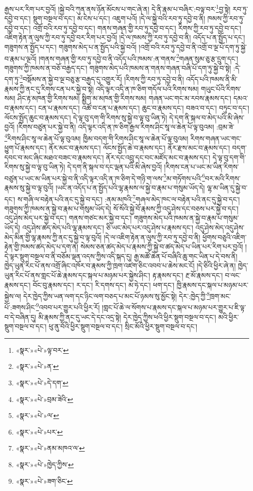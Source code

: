 རྒྱས་པར་རིག་པར་བྱའོ། །སྐྱེ་བའི་ཀུན་ནས་ཉོན་མོངས་པ་གང་ཞེ་ན། དེ་ནི་རྣམ་པ་བཞིར་:བལྟ་བར་\footnote{«སྣར་»«པེ་»ལྟ་བར་}བྱ་སྟེ། རབ་ཏུ་དབྱེ་བ་དང་། སྡུག་བསྔལ་བ་དང་། མ་ངེས་པ་དང་། འཇུག་པའོ། །དེ་ལ་སྐྱེ་བའི་རབ་ཏུ་དབྱེ་བ་ནི། ཁམས་ཀྱི་རབ་ཏུ་དབྱེ་བ་དང་། འགྲོ་བའི་རབ་ཏུ་དབྱེ་བ་དང་། གནས་གཞན་གྱི་རབ་ཏུ་དབྱེ་བ་དང་། རིགས་ཀྱི་རབ་ཏུ་དབྱེ་བ་དང་། འཇིག་རྟེན་ན་ལུས་ཀྱི་རབ་ཏུ་དབྱེ་བར་རིག་པར་བྱའོ། །དེ་ལ་ཁམས་ཀྱི་རབ་ཏུ་དབྱེ་བ་ནི། འདོད་པ་ན་སྤྱོད་པ་དང་། གཟུགས་ན་སྤྱོད་པ་དང་། གཟུགས་མེད་པ་ན་སྤྱོད་པའི་སྐྱེ་བའོ། །འགྲོ་བའི་རབ་ཏུ་དབྱེ་བ་ནི་འགྲོ་བ་ལྔ་པོ་དག་ཏུ་སྐྱེ་བ་རྣམ་པ་ལྔའོ། །གནས་གཞན་གྱི་རབ་ཏུ་དབྱེ་བ་ནི་འདོད་པའི་ཁམས་:ན་གནས་\footnote{«སྣར་»«པེ་»ན་}གཞན་སུམ་ཅུ་རྩ་དྲུག་དང་། གཟུགས་ཀྱི་ཁམས་ན་བཅོ་བརྒྱད་དང་། གཟུགས་མེད་པའི་ཁམས་ན་གནས་གཞན་བཞི་པོ་དག་ཏུ་སྐྱེ་བ་སྟེ། :དེ་དག་ཏུ་\footnote{«སྣར་»«པེ་»དེ་དག་}བསྡོམས་ན་སྐྱེ་བ་ལྔ་བཅུ་རྩ་བརྒྱད་དུ་འགྱུར་རོ། །རིགས་ཀྱི་རབ་ཏུ་དབྱེ་བ་ནི། འདོད་པའི་ཁམས་ནི་མི་རྣམས་ཀྱི་ནང་དུ་རིགས་ངན་པར་སྐྱེ་བ་སྟེ། འདི་ལྟར་འདི་ན་ཁ་ཅིག་གདོལ་པའི་རིགས་སམ། གཡུང་པོའི་རིགས་སམ། ཤིང་རྟ་མཁན་གྱི་རིགས་སམ། སྨྱིག་མ་མཁན་གྱི་རིགས་སམ། གཞན་ཡང་གང་མ་རབས་རྣམས་དང་། དམའ་བ་རྣམས་དང་། ངན་པ་རྣམས་དང་། འཚོ་བ་ངན་པ་རྣམས་དང་། ཆུང་བ་རྣམས་དང་། བཟའ་བ་དང་། བཏུང་བ་དང་། ལོངས་སྤྱོད་ཆུང་བ་རྣམས་དང་། དེ་ལྟ་བུ་དག་གི་རིགས་སུ་སྐྱེ་བ་ལྟ་བུ་ཡིན་ཏེ། དེ་དག་ནི་སྐལ་བ་མེད་པའི་མི་ཞེས་བྱའོ། །རིགས་བཙུན་པར་སྐྱེ་བ་ནི། འདི་ལྟར་འདི་ན་ཁ་ཅིག་རྒྱལ་རིགས་ཤིང་སཱ་ལ་ཆེན་པོ་ལྟ་བུའམ། :བྲམ་ཟེ་\footnote{«སྣར་»«པེ་»བྲམ་ཟེའི་}རིགས་ཤིང་སཱ་ལ་ཆེན་པོ་ལྟ་བུའམ། ཁྱིམ་བདག་གི་རིགས་ཤིང་སཱ་ལ་ཆེན་པོ་ལྟ་བུའམ། རིགས་གཞན་ཡང་གང་ཕྱུག་པོ་རྣམས་དང་། ནོར་མང་བ་རྣམས་དང་། ལོངས་སྤྱོད་ཆེ་བ་རྣམས་དང་། ནོར་རྫས་མང་བ་རྣམས་དང་། བདག་དབང་བ་མང་ཞིང་མཐའ་བཟང་བ་རྣམས་དང་། ནོར་དང་འབྲུ་དང་བང་མཛོད་མང་བ་རྣམས་དང་། དེ་ལྟ་བུ་དག་གི་རིགས་སུ་སྐྱེ་བ་ལྟ་བུ་ཡིན་ཏེ། དེ་དག་ནི་སྐལ་བ་དང་ལྡན་པའི་མི་ཞེས་བྱའོ། །རིགས་ངན་པ་ཡང་མ་ཡིན་རིགས་བཙུན་པ་ཡང་མ་ཡིན་པར་སྐྱེ་བ་ནི་འདི་ལྟར་འདི་ན་ཁ་ཅིག་དེ་གཉི་ག་ལས་\footnote{«སྣར་»«པེ་»ལ་}མ་གཏོགས་པའི་\footnote{«སྣར་»«པེ་»པར་}བར་མའི་རིགས་རྣམས་སུ་སྐྱེ་བ་ལྟ་བུའོ། །ཡང་ན་འདོད་པ་ན་སྤྱོད་པའི་ལྷ་རྣམས་ལ་སྐྱེ་བ་རྣམ་པ་གསུམ་ཡོད་དེ། ལྷ་མ་ཡིན་དུ་སྐྱེ་བ་དང་། ས་གཞི་ལ་བརྟེན་པའི་ནང་དུ་སྐྱེ་བ་དང་། :ནམ་མཁའི་\footnote{«སྣར་»«པེ་»ནམ་མཁའ་ལ་}གཞལ་མེད་ཁང་ལ་བརྟེན་པའི་ནང་དུ་སྐྱེ་བ་དང་། གཟུགས་ཀྱི་ཁམས་ན་སྐྱེ་བ་རྣམ་པ་གསུམ་ཡོད་དེ། སོ་སོའི་སྐྱེ་བོ་རྣམས་ཀྱི་འདུ་ཤེས་དང་བཅས་པར་སྐྱེ་བ་དང་། འདུ་ཤེས་མེད་པར་སྐྱེ་བ་དང་། གནས་གཙང་མར་སྐྱེ་བ་དང་། གཟུགས་མེད་པའི་ཁམས་ན་སྐྱེ་བ་རྣམ་པ་གསུམ་ཡོད་དེ། འདུ་ཤེས་ཚད་མེད་པའི་ལྷ་རྣམས་དང་། ཅི་ཡང་མེད་པར་འདུ་ཤེས་པ་རྣམས་དང་། འདུ་ཤེས་མེད་འདུ་ཤེས་མེད་མིན་གྱི་ལྷ་རྣམས་ཀྱི་ནང་དུ་སྐྱེ་བ་ལྟ་བུའོ། །དེ་ལ་འཇིག་རྟེན་ན་ལུས་ཀྱི་རབ་ཏུ་དབྱེ་བ་ནི། ཕྱོགས་བཅུའི་འཇིག་རྟེན་གྱི་ཁམས་ཚད་མེད་པ་དག་ན། སེམས་ཅན་ཚད་མེད་པ་རྣམས་ཀྱི་སྐྱེ་བ་ཚད་མེད་པ་ཡིན་པར་རིག་པར་བྱའོ། །དེ་ལྟར་སྡུག་བསྔལ་བ་ནི་བཅོམ་ལྡན་འདས་ཀྱིས་འདི་སྐད་དུ། རྒྱ་མཚོ་ཆེན་པོ་བཞིའི་ཆུ་གང་ཡིན་པ་དེ་བས་ནི། ཁྱེད་ཡུན་རིང་པོ་ནས་འགྲོ་ཞིང་འཁོར་བ་རྣམས་ཀྱི་ཁྲག་འཛག་ཅིང་འབབ་པ་ཆེས་མང་ངོ། །དེ་ཅིའི་ཕྱིར་ཞེ་ན། ཁྱེད་ཡུན་རིང་པོ་ནས་གླང་པོ་ཆེ་རྣམས་དང་སྐལ་པ་མཉམ་པར་སྐྱེས་ཤིང་། རྟ་རྣམས་དང་། རྔ་མོ་རྣམས་དང་། བ་ལང་རྣམས་དང་། བོང་བུ་རྣམས་དང་། ར་དང་། རི་དགས་དང་། མ་ཧེ་དང་། ཕག་དང་། ཁྱི་རྣམས་དང་སྐལ་པ་མཉམ་པར་སྐྱེས་ལ། དེར་ཁྱེད་ཀྱིས་ཡན་ལག་དང་ཉིང་ལག་བཅད་པ་མང་པོ་ཉམས་སུ་མྱོང་སྟེ། དེར་:ཁྱེད་ཀྱི་\footnote{«སྣར་»«པེ་»ཁྱེད་ཀྱིས་}ཁྲག་མང་པོ་:ཟགས་ཤིང་\footnote{«སྣར་»«པེ་»ཟག་ཅིང་}འབབ་པར་གྱུར་པའི་ཕྱིར་རོ། །གླང་པོ་ཆེ་ལ་སོགས་པ་རྣམས་དང་སྐལ་པ་མཉམ་པར་གྱུར་པ་ཇི་ལྟ་བ་དེ་བཞིན་དུ། མི་རྣམས་ཀྱི་ནང་དུ་ཡང་དེ་དང་འདྲ་སྟེ། དེར་ཁྱེད་ཀྱིས་ཕའི་ཕྱིར་སྡུག་བསྔལ་བ་དང་། མའི་ཕྱིར་སྡུག་བསྔལ་བ་དང་། ཕུ་ནུ་བོའི་ཕྱིར་སྡུག་བསྔལ་བ་དང་། སྲིང་མོའི་ཕྱིར་སྡུག་བསྔལ་བ་དང་། 